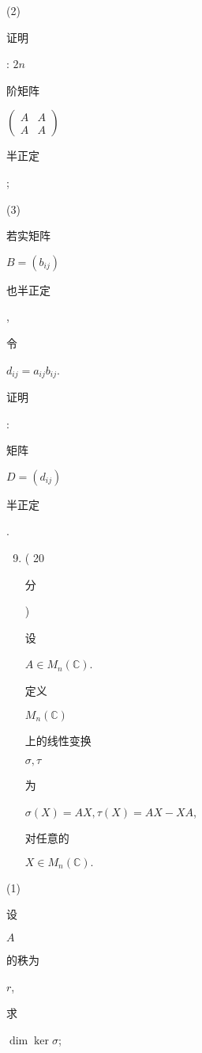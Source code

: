 \documentclass[10pt]{article}
\begin{document}
(2) \begin{CJK}{UTF8}{mj}证明\end{CJK}: $2 n$ \begin{CJK}{UTF8}{mj}阶矩阵\end{CJK} $\left(\begin{array}{cc}A & A \\ A & A\end{array}\right)$ \begin{CJK}{UTF8}{mj}半正定\end{CJK};

(3) \begin{CJK}{UTF8}{mj}若实矩阵\end{CJK} $B=\left(b_{i j}\right)$ \begin{CJK}{UTF8}{mj}也半正定\end{CJK}, \begin{CJK}{UTF8}{mj}令\end{CJK} $d_{i j}=a_{i j} b_{i j}$. \begin{CJK}{UTF8}{mj}证明\end{CJK}: \begin{CJK}{UTF8}{mj}矩阵\end{CJK} $D=\left(d_{i j}\right)$ \begin{CJK}{UTF8}{mj}半正定\end{CJK}.

\begin{enumerate}
  \setcounter{enumi}{8}
  \item ( 20 \begin{CJK}{UTF8}{mj}分\end{CJK}) \begin{CJK}{UTF8}{mj}设\end{CJK} $A \in M_{n}(\mathbb{C})$. \begin{CJK}{UTF8}{mj}定义\end{CJK} $M_{n}(\mathbb{C})$ \begin{CJK}{UTF8}{mj}上的线性变换\end{CJK} $\sigma, \tau$ \begin{CJK}{UTF8}{mj}为\end{CJK} $\sigma(X)=A X, \tau(X)=A X-X A$, \begin{CJK}{UTF8}{mj}对任意的\end{CJK} $X \in M_{n}(\mathbb{C}) .$
\end{enumerate}
(1) \begin{CJK}{UTF8}{mj}设\end{CJK} $A$ \begin{CJK}{UTF8}{mj}的秩为\end{CJK} $r$, \begin{CJK}{UTF8}{mj}求\end{CJK} $\operatorname{dim} \operatorname{ker} \sigma$;
\end{document}
